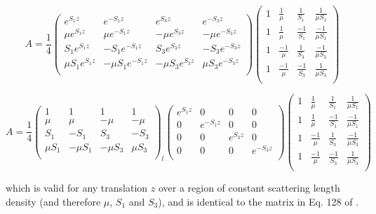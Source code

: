 \documentclass[%
 reprint,
 amsmath,
 amssymb,
 aps,
 prl,
 lengthcheck,%
]{revtex4-1}
\begin{document}
\begin{widetext}
\begin{equation}
  A = \frac{1}{4}
  \begin{pmatrix}
    e^{S_1 z} & e^{-S_1 z} & e^{S_3 z} & e^{-S_3 z} \\[0.3em]
    \mu e^{S_1 z} & \mu e^{-S_1 z} & -\mu e^{S_3 z} & -\mu e^{-S_3 z} \\[0.3em]
    S_1 e^{S_1 z} & -S_1 e^{-S_1 z} & S_3 e^{S_3 z} & -S_3e^{-S_3 z} \\[0.3em]
    \mu S_1 e^{S_1 z} & -\mu S_1 e^{-S_1 z} & -\mu S_3 e^{S_3 z} & \mu S_3 e^{-S_3 z} \\[0.3em]
  \end{pmatrix}
  \begin{pmatrix}
    1 & \frac{1}{\mu} & \frac{1}{S_1} & \frac{1}{\mu S_1} \\[0.3em]
    1 & \frac{1}{\mu} & \frac{-1}{S_1} & \frac{-1}{\mu S_1} \\[0.3em]
    1 & \frac{-1}{\mu} & \frac{1}{S_3} & \frac{-1}{\mu S_3} \\[0.3em]
    1 & \frac{-1}{\mu} & \frac{-1}{S_3} & \frac{1}{\mu S_3} \\[0.3em]
  \end{pmatrix}
\end{equation}

\begin{equation}
  A = \frac{1}{4}
  \left(
  \begin{matrix}
    1 & 1 & 1 & 1 \\[0.3em]
    \mu & \mu & -\mu & -\mu \\[0.3em]
    S_1 & -S_1 & S_3 & -S_3 \\[0.3em]
    \mu S_1  & -\mu S_1 & -\mu S_3 & \mu S_3 \\[0.3em]
  \end{matrix}
  \right)_{\!\!\!\!l}
  \left(
  \begin{matrix}
    e^{S_1 z} & 0 & 0 & 0 \\[0.3em]
    0 & e^{-S_1 z} & 0 & 0 \\[0.3em]
    0 & 0 & e^{S_3 z} & 0 \\[0.3em]
    0 & 0 & 0 & e^{-S_3 z} \\[0.3em]
  \end{matrix}
  \right)
  \begin{pmatrix}
    1 & \frac{1}{\mu} & \frac{1}{S_1} & \frac{1}{\mu S_1} \\[0.3em]
    1 & \frac{1}{\mu} & \frac{-1}{S_1} & \frac{-1}{\mu S_1} \\[0.3em]
    1 & \frac{-1}{\mu} & \frac{1}{S_3} & \frac{-1}{\mu S_3} \\[0.3em]
    1 & \frac{-1}{\mu} & \frac{-1}{S_3} & \frac{1}{\mu S_3} \\[0.3em]
  \end{pmatrix}
\end{equation}
\end{widetext}
which is valid for any translation $z$ over a region of constant scattering 
length density (and therefore $\mu$, $S_1$ and $S_3$), and is identical to the 
matrix in Eq. 128 of \cite{PNRMajkrzakChapter}.
\end{document}
